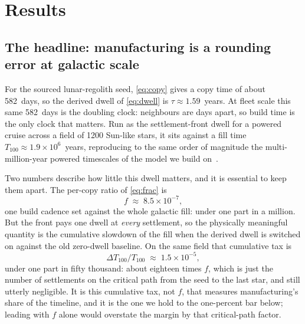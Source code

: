 \section{Results}
\label{sec:results}

\subsection{The headline: manufacturing is a rounding error at galactic scale}
For the sourced lunar-regolith seed, \eqref{eq:copy} gives a copy time of about 582~days,
so the derived dwell of \eqref{eq:dwell} is $\tau \approx 1.59$~years. At fleet scale this
same 582~days is the doubling clock: neighbours are days apart, so build time is the only
clock that matters. Run as the settlement-front dwell for a powered cruise across a field of
1200 Sun-like stars, it sits against a fill time $T_{100} \approx 1.9\times10^{6}$~years,
reproducing to the same order of magnitude the multi-million-year powered timescales of the
model we build on~\citep{nicholson-forgan-2013}.

Two numbers describe how little this dwell matters, and it is essential to keep them apart. The
per-copy ratio of \eqref{eq:frac} is
\begin{equation}
f \;\approx\; 8.5\times10^{-7},
\end{equation}
one build cadence set against the whole galactic fill: under one part in a million. But the
front pays one dwell at \emph{every} settlement, so the physically meaningful quantity is the
cumulative slowdown of the fill when the derived dwell is switched on against the old zero-dwell
baseline. On the same field that cumulative tax is
\begin{equation}
\Delta T_{100}/T_{100} \;\approx\; 1.5\times10^{-5},
\label{eq:cumtax}
\end{equation}
under one part in fifty thousand: about eighteen times $f$, which is just the number of
settlements on the critical path from the seed to the last star, and still utterly negligible.
It is this cumulative tax, not $f$, that measures manufacturing's share of the timeline, and it
is the one we hold to the one-percent bar below; leading with $f$ alone would overstate the
margin by that critical-path factor.

